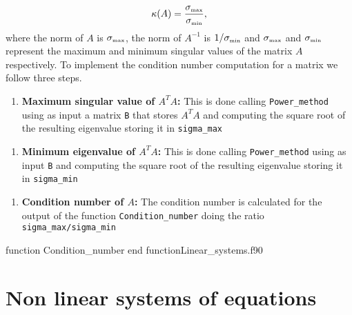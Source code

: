  
      \begin{equation*}
      \kappa(A)= \frac{\sigma_{\mbox{\tiny max}}}{\sigma_{\mbox{\tiny min}}},
      \end{equation*}
 where the norm of $ A $ is $\sigma_{\mbox{\tiny max}}$, the norm of 
 $A^{-1}$ is $ 1/\sigma_{\mbox{\tiny min}} $  and $\sigma_{\mbox{\tiny 
 max}}$  and $  \sigma_{\mbox{\tiny min}} $ represent the maximum and minimum  
 singular values of the matrix $A$ respectively. 
 To implement the condition number computation for a matrix we follow three 
 steps.
      \begin{enumerate}
      	\item \textbf{Maximum singular value of $A^TA$:} This is done calling 
      	\verb|Power_method| using as input a matrix \texttt{B} that stores 
      	$A^TA$ and computing the square root of the resulting eigenvalue 
      	storing it in \verb|sigma_max|
      \end{enumerate}
  
      \begin{enumerate}[resume]
      	\item \textbf{Minimum eigenvalue of $A^TA$:} This is done calling 
      	\verb|Power_method| using as input \texttt{B} and computing the square 
      	root of the resulting eigenvalue storing it in \verb|sigma_min|
      \end{enumerate}
       
      
      \begin{enumerate}[resume]
      	\item \textbf{Condition number of $A$:} The condition number is 
      	calculated for the output of the function \verb|Condition_number| doing 
      	the ratio \verb|sigma_max/sigma_min| 
      \end{enumerate}
      
      \vspace{0.5cm} 
      {function Condition_number}
      {end function}{Linear_systems.f90}
 
 
 
 
 
   
 \newpage  
  \section{Non linear systems of equations }
      
